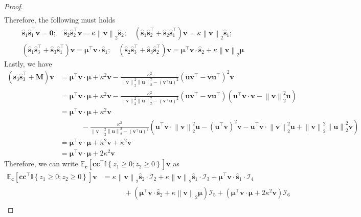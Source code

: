 \documentclass[10pt,a4paper]{amsart}
\def\bfM{{\mathbf{M}}}\def\bfN{{\mathbf{N}}}\def\bfO{{\mathbf{O}}}\def\bfP{{\mathbf{P}}}
\def\bfc{{\mathbf{c}}}\def\bfd{{\mathbf{d}}}
\def\bfs{{\mathbf{s}}}\def\bft{{\mathbf{t}}}
\def\bfu{{\mathbf{u}}}\def\bfv{{\mathbf{v}}}\def\bfw{{\mathbf{w}}}\def\bfx{{\mathbf{x}}}
\def\bfv{{\mathbf{v}}}\def\bfw{{\mathbf{w}}}\def\bfx{{\mathbf{x}}}
\newcommand{\indy}[1]{\mathbb{I}\left\{#1\right\}}
\newcommand{\norm}[1]{\left\|#1\right\|}
\newcommand{\paren}[1]{\left(#1\right)}
\providecommand{\E}{\mathbb{E}}
\begin{document}
\begin{proof}
\begin{align*}
    \end{align*}
    Therefore, the following must holds
    \begin{gather*}
        \hat{\bfs}_1\hat{\bfs}_1^\top\bfv = \bm{0};\quad \hat{\bfs}_2\hat{\bfs}_2^\top\bfv = \kappa\norm{\bfv}_2\hat{\bfs}_2;\quad \paren{\hat{\bfs}_1\hat{\bfs}_2^\top + \hat{\bfs}_2\hat{\bfs}_1^\top}\bfv = \kappa\norm{\bfv}_2\hat{\bfs}_1; \\
        \paren{\hat{\bfs}_1\hat{\bfs}_3^\top + \hat{\bfs}_3\hat{\bfs}_1^\top}\bfv = \bm{\mu}^\top\bfv\cdot \hat{\bfs}_1;\quad \paren{\hat{\bfs}_2\hat{\bfs}_3^\top + \hat{\bfs}_3\hat{\bfs}_2^\top}\bfv = \bm{\mu}^\top\bfv\cdot \hat{\bfs}_2 + \kappa\norm{\bfv}_2\bm{\mu}
    \end{gather*}
    Lastly, we have
    \begin{align*}
        \paren{\hat{\bfs}_3\hat{\bfs}_3^\top + \bfM}\bfv & = \bm{\mu}^\top\bfv \cdot \bm{\mu} + \kappa^2\bfv - \frac{\kappa^2}{\norm{\bfv}_2^2\norm{\bfu}_2^2 - \paren{\bfv^\top\bfu}^2}\paren{\bfu\bfv^\top-\bfv\bfu^\top}^2\bfv\\
        & = \bm{\mu}^\top\bfv \cdot \bm{\mu} + \kappa^2\bfv - \frac{\kappa^2}{\norm{\bfv}_2^2\norm{\bfu}_2^2 - \paren{\bfv^\top\bfu}^2}\paren{\bfu\bfv^\top -\bfv\bfu^\top}\paren{\bfu^\top\bfv\cdot\bfv - \norm{\bfv}_2^2\bfu}\\
        & = \bm{\mu}^\top\bfv \cdot \bm{\mu} + \kappa^2\bfv\\
        &\quad\quad\quad - \frac{\kappa^2}{\norm{\bfv}_2^2\norm{\bfu}_2^2 - \paren{\bfv^\top\bfu}^2}\paren{\bfu^\top\bfv\cdot \norm{\bfv}_2^2\bfu - \paren{\bfu^\top\bfv}^2\bfv - \bfu^\top\bfv\cdot\norm{\bfv}_2^2\bfu + \norm{\bfv}_2^2\norm{\bfu}_2^2\bfv}\\
        &=\bm{\mu}^\top\bfv \cdot \bm{\mu} + \kappa^2\bfv + \kappa^2\bfv\\
        & = \bm{\mu}^\top\bfv \cdot \bm{\mu} + 2\kappa^2\bfv
    \end{align*}
    Therefore, we can write $\E_{\bfc}\left[\bfc\bfc^\top\indy{z_1\geq 0;z_2\geq 0}\right]\bfv$ as
    \begin{equation}
        \label{eq:mat_exp_vec_prod_form1}
        \begin{aligned}
            \E_{\bfc}\left[\bfc\bfc^\top\indy{z_1\geq 0;z_2\geq 0}\right]\bfv & = \kappa\norm{\bfv}_2\hat{\bfs}_2\cdot\mathcal{I}_2 + \kappa\norm{\bfv}_2\hat{\bfs}_1\cdot\mathcal{I}_3 + \bm{\mu}^\top\bfv \cdot\hat{\bfs}_1\cdot \mathcal{I}_4\\
            &\quad\quad\quad + \paren{\bm{\mu}^\top\bfv\cdot \hat{\bfs}_2 + \kappa\norm{\bfv}_2\bm{\mu}}\mathcal{I}_5 + \paren{\bm{\mu}^\top\bfv \cdot \bm{\mu} + 2\kappa^2\bfv}\mathcal{I}_6\\

\end{aligned}
\end{equation}
\end{proof}
\end{document}
